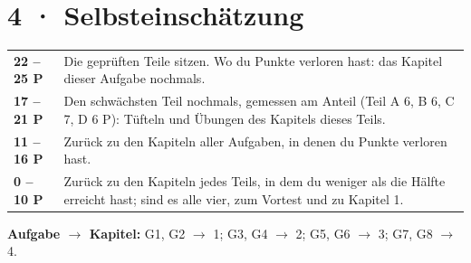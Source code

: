 \documentclass[11pt]{article}
\begin{document}
\section*{4 · Selbsteinschätzung}
\begin{tabularx}{\linewidth}{@{}l X@{}}
\toprule
\textbf{22 – 25 P} & Die geprüften Teile sitzen. Wo du Punkte verloren hast: das Kapitel dieser Aufgabe nochmals.\\
\textbf{17 – 21 P} & Den schwächsten Teil nochmals, gemessen am Anteil (Teil A 6, B 6, C 7, D 6 P): Tüfteln und Übungen des Kapitels dieses Teils.\\
\textbf{11 – 16 P} & Zurück zu den Kapiteln aller Aufgaben, in denen du Punkte verloren hast.\\
\textbf{0 – 10 P} & Zurück zu den Kapiteln jedes Teils, in dem du weniger als die Hälfte erreicht hast; sind es alle vier, zum Vortest und zu Kapitel 1.\\
\bottomrule
\end{tabularx}

\smallskip
\textbf{Aufgabe $\to$ Kapitel:} G1, G2 $\to$ 1; G3, G4 $\to$ 2; G5, G6 $\to$ 3; G7, G8 $\to$ 4.
\end{document}
